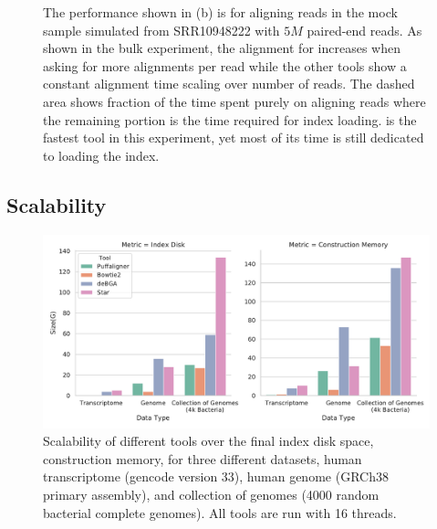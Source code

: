 \begin{figure}[H]
{    The performance shown in (b) is for aligning reads
    in the mock sample simulated from SRR10948222 with $5M$ paired-end reads.
    As shown in the bulk experiment, the alignment for \bt
    increases when asking for more alignments per read while the other tools show a
    constant alignment time scaling over number of reads. The dashed area
    shows fraction of the time spent purely on aligning reads where the
    remaining portion is the time required for index loading. \puffaligner is 
    the fastest tool in this experiment, yet most of its time is still dedicated
    to loading the index.}
    \label{fig:alignment_performance}
    \vspace{-0.2in}
\end{figure}



\subsection{Scalability}
\begin{figure}[h!]
    \centering
    \includegraphics[width=0.8\columnwidth,type=pdf,ext=.pdf,read=.pdf]
    {Figures/puff/indexSizeScale}
    \caption[scalability of different aligners - memory]
    {Scalability of different tools over the final index disk space, construction 
    memory, for three different datasets, human transcriptome (gencode version 33), 
    human genome (GRCh38 primary assembly), and collection of genomes (4000
    random bacterial complete genomes). All tools are run with 16 threads.}
    \label{sfig:size}
\end{figure}
